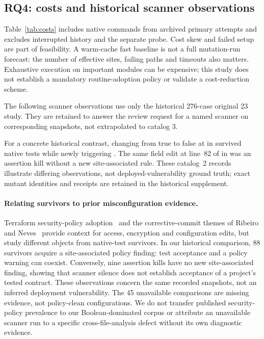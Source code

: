 \subsection{RQ4: costs and historical scanner observations}\label{sec:costs}

Table~\ref{tab:costs} includes native commands from archived primary attempts and excludes interrupted history and the separate probe. Cost skew and failed setup are part of feasibility. A warm-cache fast baseline is not a full mutation-run forecast: the number of effective sites, failing paths and timeouts also matters. Exhaustive execution on important modules can be expensive; this study does not establish a mandatory routine-adoption policy or validate a cost-reduction scheme.

The following scanner observations use only the historical 276-case original 23 study. They are retained to answer the review request for a named scanner on corresponding snapshots, not extrapolated to catalog 3.

For a concrete historical contrast, changing  from true to false at  in  survived native tests while newly triggering . The same field edit at line~82 of  in  was an assertion kill without a new site-associated rule. These catalog~2 records illustrate differing observations, not deployed-vulnerability ground truth; exact mutant identities and receipts are retained in the historical supplement.
\paragraph{Relating survivors to prior misconfiguration evidence.}\label{sec:survivorcontext}
Terraform security-policy adoption~\cite{verdet} and the corrective-commit themes of Ribeiro and Neves~\cite{ribeiro} provide context for access, encryption and configuration edits, but study different objects from native-test survivors. In our historical comparison, 88 survivors acquire a site-associated policy finding: test acceptance and a policy warning can coexist. Conversely, nine assertion kills have no new site-associated finding, showing that scanner silence does not establish acceptance of a project's tested contract. These observations concern the same recorded snapshots, not an inferred deployment vulnerability. The 45 unavailable comparisons are missing evidence, not policy-clean configurations. We do not transfer published security-policy prevalence to our Boolean-dominated corpus or attribute an unavailable scanner run to a specific cross-file-analysis defect without its own diagnostic evidence.
\FloatBarrier

